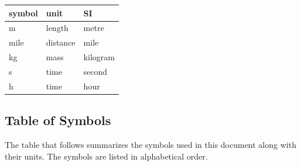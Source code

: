 \documentclass[12pt]{article}
\begin{document}
\renewcommand{\arraystretch}{1.2}
  \noindent \begin{tabular}{l l l} 
    \toprule		
    \textbf{symbol} & \textbf{unit} & \textbf{SI}\\
    \midrule 

    \si{\metre} & length & metre \\
    \si{mile} & distance & mile \\
    \si{\kilogram} & mass & kilogram \\
    \si{\second} & time & second \\
    \si{h} & time & hour \\

    \bottomrule
  \end{tabular}

\subsection{Table of Symbols}

The table that follows summarizes the symbols used in this document along with
their units. The symbols are listed in alphabetical order.

\break
\break
\end{document}
